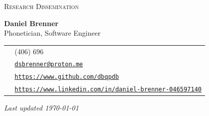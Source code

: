 \documentclass{article}
\begin{document}
\thispagestyle{empty}
\lfoot{}
\cfoot{}
\rfoot{}

\centerline{\large\textsc{Research Dissemination}}
\vspace{.5cm}
\noindent\Large\textbf{Daniel Brenner} \\
\large Phonetician, Software Engineer \\

\noindent
\begin{tabular}{c l}
	\faPhoneSquare* & (406) 696\textendash 7069 \\
	\faEnvelope & \href{mailto:dsbrenner@proton.me}{\texttt{dsbrenner@proton.me}} \\
	\faGithub & \href{https://www.github.com/dbqpdb}{\texttt{https://www.github.com/dbqpdb}} \\
	\faLinkedin & \href{https://www.linkedin.com/in/daniel-brenner-046597140}{\texttt{https://www.linkedin.com/in/daniel-brenner-046597140}}
\end{tabular}

\sectionspacing


\sectionspacing


\sectionspacing


\sectionspacing


\sectionspacing


\sectionspacing


\vfill
\begin{center}
\small\textit{Last updated \today}
\end{center}


\end{document}
